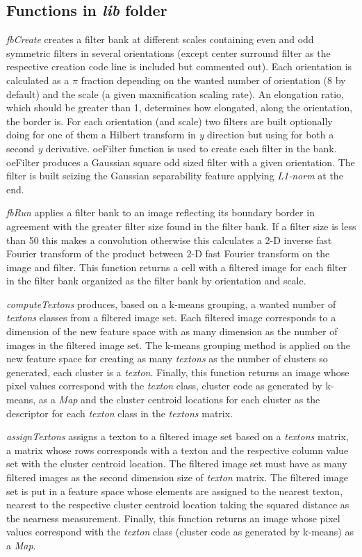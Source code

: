 \documentclass[10pt,twocolumn,letterpaper]{article}
\begin{document}
\subsection{Functions in \textit{lib} folder}

\textit{fbCreate} creates a filter bank at different scales containing even and odd symmetric filters in several orientations (except center surround filter as the respective creation code line is included but commented out). Each orientation is calculated as a $\pi$ fraction depending on the wanted number of orientation (8 by default) and the scale (a given maxnification scaling rate). An elongation ratio, which should be greater than 1, determines how elongated, along the orientation, the border is. For each orientation (and scale) two filters are built optionally doing for one of them a Hilbert transform in \textit{y} direction but using for both a second \textit{y} derivative. oeFilter function is used to create each filter in the bank. oeFilter produces a Gaussian square odd sized filter with a given orientation. The filter is built seizing the Gaussian separability feature applying \textit{L1-norm} at the end.

\textit{fbRun} applies a filter bank to an image reflecting its boundary border in agreement with the greater filter size found in the filter bank. If a filter size is less than 50 this makes a convolution otherwise this calculates a 2-D inverse fast Fourier transform of the product between 2-D fast Fourier transform on the image and filter. This function returns a cell with a filtered image for each filter in the filter bank organized as the filter bank by orientation and scale.

\textit{computeTextons} produces, based on a k-means grouping, a wanted number of \textit{textons} classes from a filtered image set. Each filtered image corresponds to a dimension of the new feature space with as many dimension as the number of images in the filtered image set. The k-means grouping method is applied on the new feature space for creating as many \textit{textons} as the number of clusters so generated, \ie each cluster is a \textit{texton}. Finally, this function returns an image whose pixel values correspond with the \textit{texton} class, \ie cluster code as generated by k-means, as a \textit{Map} and the cluster centroid locations for each cluster as the descriptor for each \textit{texton} class in the \textit{textons} matrix.

\textit{assignTextons} assigns a texton to a filtered image set based on a \textit{textons} matrix, \ie a matrix whose rows corresponds with a texton and the respective column value set with the cluster centroid location. The filtered image set must have as many filtered images as the second dimension size of \textit{texton} matrix. The filtered image set is put in a feature space whose elements are assigned to the nearest texton, \ie nearest to the respective cluster centroid location taking the squared distance as the nearness measurement. Finally, this function returns an image whose pixel values correspond with the \textit{texton} class (\ie cluster code as generated by k-means) as a \textit{Map}.
\end{document}
